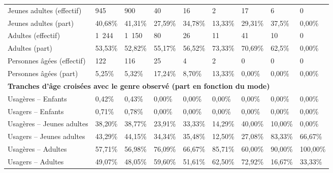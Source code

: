 \begin{longtable}{p{3.7cm}p{0.9cm}p{0.9cm}p{0.9cm}p{0.9cm}p{0.9cm}p{0.9cm}p{0.9cm}p{0.9cm}}
    \small{Jeunes adultes (effectif)} & \small{945} & \small{900} & \small{40} & \small{16} & \small{2} & \small{17} & \small{6} & \small{0}\\    
    \small{Jeunes adultes (part)} & \small{40,68\%} & \small{41,31\%} & \small{27,59\%} & \small{34,78\%} & \small{13,33\%} & \small{29,31\%} & \small{37,5\%} & \small{0,00\%}\\    
    \small{Adultes (effectif)} & \small{1~244} & \small{1~150} & \small{80} & \small{26} & \small{11} & \small{41} & \small{10} & \small{0}\\    
    \small{Adultes (part)} & \small{53,53\%} & \small{52,82\%} & \small{55,17\%} & \small{56,52\%} & \small{73,33\%} & \small{70,69\%} & \small{62,5\%} & \small{0,00\%}\\    
    \small{Personnes âgées (effectif)} & \small{122} & \small{116} & \small{25} & \small{4} & \small{2} & \small{0} & \small{0} & \small{0}\\    
    \small{Personnes âgées (part)} & \small{5,25\%} & \small{5,32\%} & \small{17,24\%} & \small{8,70\%} & \small{13,33\%} & \small{0,00\%} & \small{0,00\%} & \small{0,00\%}\\
    \hline
\multicolumn{9}{l}{\textbf{Tranches d'âge croisées avec le genre observé (part en fonction du mode)}}\\
    \small{Usagères – Enfants} & \small{0,42\%} & \small{0,43\%} & \small{0,00\%} & \small{0,00\%} & \small{0,00\%} & \small{0,00\%} & \small{0,00\%} & \small{0,00\%}\\
    \small{Usagers – Enfants} & \small{0,71\%} & \small{0,78\%} & \small{0,00\%} & \small{0,00\%} & \small{0,00\%} & \small{0,00\%} & \small{0,00\%} & \small{0,00\%}\\
    \small{Usagères – Jeunes adultes} & \small{38,20\%} & \small{38,77\%} & \small{23,91\%} & \small{33,33\%} & \small{14,29\%} & \small{40,00\%} & \small{10,00\%} & \small{0,00\%}\\
    \small{Usagers – Jeunes adultes} & \small{43,29\%} & \small{44,15\%} & \small{34,34\%} & \small{35,48\%} & \small{12,50\%} & \small{27,08\%} & \small{83,33\%} & \small{66,67\%}\\
    \small{Usagères – Adultes} & \small{57,71\%} & \small{56,98\%} & \small{76,09\%} & \small{66,67\%} & \small{85,71\%} & \small{60,00\%} & \small{90,00\%} & \small{100,00\%}\\
    \small{Usagers – Adultes} & \small{49,07\%} & \small{48,05\%} & \small{59,60\%} & \small{51,61\%} & \small{62,50\%} & \small{72,92\%} & \small{16,67\%} & \small{33,33\%}\\

\end{longtable}
